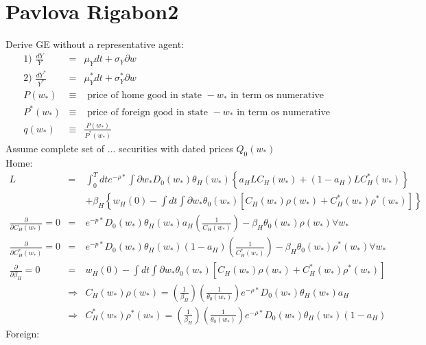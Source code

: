 \documentclass[]{article}
\begin{document}
\section*{Pavlova Rigabon2}
Derive GE without a representative agent:
\begin{eqnarray*}
\mbox{1) } \frac{dY}{Y} &=& \mu _Y dt + \sigma _Y \partial w\\
\mbox{2) } \frac{dY^*}{Y^*} &=& \mu _Y^* dt + \sigma _Y^* \partial w\\
P(w_*) &\equiv & \mbox{ price of home good in state } - w_* \mbox{ in term os numerative }\\
P^*(w_*) &\equiv & \mbox{ price of foreign good in state } - w_* \mbox{ in term os numerative }\\
q(w_*) &\equiv & \frac{P(w_*)}{P^*(w_*)}
\end{eqnarray*}
Assume complete set of ... securities with dated prices $ Q_0(w_*)$\\
Home: 
\begin{eqnarray*}
L &=& \int_0^T dt e^{-\rho *} \int \partial w_* D_0(w_*) \theta _H (w_*) \left\{ a_H LC_H(w_*) + (1-a_H) L C_H^*(w_*)\right\}\\
&& + \beta _H \left\{ w_H(0) - \int dt \int \partial w_* \theta _0(w_*) \left[C_H(w_*) \rho(w_*) + C_H^*(w_*)\rho ^*(w_*)\right]\right\}\\
\frac{\partial}{\partial C_H(w_*)} = 0 &=& e^{-p*} D_0(w_*) \theta _H(w_*) a_H \left(\frac{1}{C_H(w_*)}\right) - \beta _H \theta _0(w_*) \rho (w_*) \forall w_*\\
\frac{\partial}{\partial C_H^*(w_*)} = 0 &=& e^{-p*} D_0(w_*) \theta _H(w_*) (1-a_H) \left(\frac{1}{C_H^*(w_*)}\right) - \beta _H \theta _0(w_*) \rho ^* (w_*) \forall w_*\\
\frac{\partial}{\partial \beta _H} = 0 &=& w_H(0) - \int dt \int \partial w_* \theta _0(w_*) \left[C_H(w_*) \rho (w_*) + C_H^* (w_*) \rho ^*(w_*)\right]\\
&\Rightarrow & C_H(w_*) \rho (w_*) = \left(\frac{1}{\beta _H}\right) \left(\frac{1}{\theta _0(w_*)}\right) e^{-\rho *} D_0(w_*) \theta _H(w_*) a_H\\
& \Rightarrow & C_H^*(w_*) \rho ^*(w_*) = \left(\frac{1}{\beta _H}\right) \left(\frac{1}{\theta _0(w_*)}\right) e^{-\rho *} D_0(w_*) \theta _H(w_*) (1-a_H)
\end{eqnarray*}
Foreign: 
\end{document}
